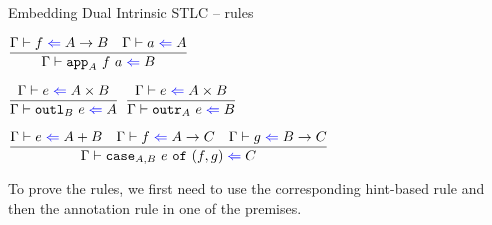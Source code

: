 \documentclass{beamer}
\begin{document}
\begin{frame}{Embedding Dual Intrinsic STLC -- rules}

\begin{center}
  $\infrule{\check{f}{\Fun{A}{B}} \quad \check{a}{A}}{\check{\app[A]{f}{a}}{B}}$

  \vspace{2em}

  $\infrule{\check{e}{\Prod{A}{B}}}{\check{\outl[B]{e}}{A}}$ \enspace
  $\infrule{\check{e}{\Prod{A}{B}}}{\check{\outr[A]{e}}{B}}$

  \vspace{2em}

  $\infrule{\check{e}{\Sum{A}{B}} \quad \check{f}{\Fun{A}{C}} \quad \check{g}{\Fun{B}{C}}}{\check{\caseannot{A}{B}{e}{f}{g}}{C}}$
\end{center}

\vspace{2em}

To prove the rules, we first need to use the corresponding hint-based rule and then the annotation rule in one of the premises.

\end{frame}
\end{document}
